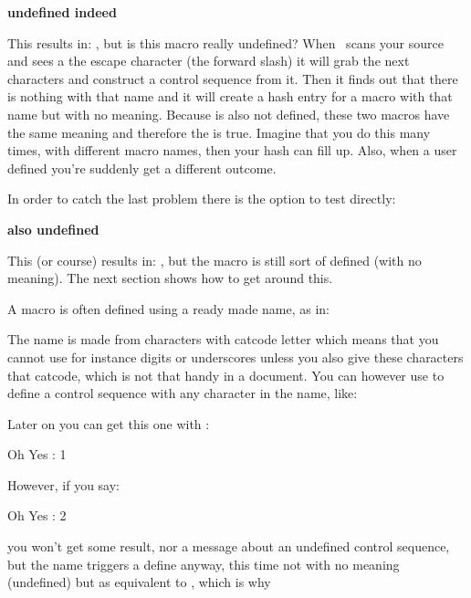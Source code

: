 \startbuffer
\ifx\MyMacro\undefined
    {\bf undefined indeed}
\fi
\stopbuffer

\typebuffer[option=TEX]

This results in: \inlinebuffer , but is this macro really undefined? When \TEX\
scans your source and sees a the escape character (the forward slash) it will
grab the next characters and construct a control sequence from it. Then it finds
out that there is nothing with that name and it will create a hash entry for a
macro with that name but with no meaning. Because \type {\undefined} is also not
defined, these two macros have the same meaning and therefore the \type {\ifx} is
true. Imagine that you do this many times, with different macro names, then your
hash can fill up. Also, when a user defined \type {\undefined} you're suddenly
get a different outcome.

In order to catch the last problem there is the option to test directly:

\startbuffer
\ifdefined\MyOtherMacro \else
    {\bf also undefined}
\fi
\stopbuffer

\typebuffer[option=TEX]

This (or course) results in: \inlinebuffer, but the macro is still sort of
defined (with no meaning). The next section shows how to get around this.

\stopsectionlevel

\startsectionlevel[title={\tex{ifcsname}}]

A macro is often defined using a ready made name, as in:

\starttyping[option=TEX]
\stoptyping

The name is made from characters with catcode letter which means that you cannot
use for instance digits or underscores unless you also give these characters that
catcode, which is not that handy in a document. You can however use \type
{\csname} to define a control sequence with any character in the name, like:

\starttyping[option=TEX]
\expandafter{}
\stoptyping

Later on you can get this one with \type {\csname}:

\starttyping[option=TEX]
\csname Oh Yes : 1\endcsname
\stoptyping

However, if you say:

\starttyping[option=TEX]
\csname Oh Yes : 2\endcsname
\stoptyping

you won't get some result, nor a message about an undefined control sequence, but
the name triggers a define anyway, this time not with no meaning (undefined) but
as equivalent to \type {\relax}, which is why

